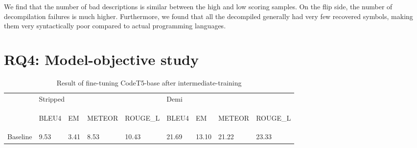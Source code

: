 We find that the number of bad descriptions is similar between the high and low scoring samples. On the flip side, the number of decompilation failures is much higher.
Furthermore, we found that all the decompiled generally had very few recovered symbols, making them very syntactically poor compared to actual programming languages.


\section{RQ4: Model-objective study}
\label{tab:intermediate}
\begin{table}[!h]
\centering
\caption{Result of fine-tuning CodeT5-base after intermediate-training}
\begin{tabular}{l|llll|llll}
\rowcolor[rgb]{0.749,0.749,0.749} \multicolumn{1}{l}{} & \multicolumn{4}{l|}{Stripped}                                                                                                                        & Demi                               &                                  &                                      &                                       \\ 
\cline{2-9}
\begin{sideways}\textbf{}\end{sideways}                & \begin{sideways}BLEU4\end{sideways} & \begin{sideways}EM\end{sideways} & \begin{sideways}METEOR\end{sideways} & \begin{sideways}ROUGE\_L\end{sideways} & \begin{sideways}BLEU4\end{sideways} & \begin{sideways}EM\end{sideways} & \begin{sideways}METEOR\end{sideways} & \begin{sideways}ROUGE\_L\end{sideways}  \\ 
\hline
Baseline                                               & 9.53                                & 3.41                          & 8.53                                & 10.43                                   & 21.69                              & 13.10  & 21.22                                & 23.33                                                           \\

\end{tabular}
\end{table}

